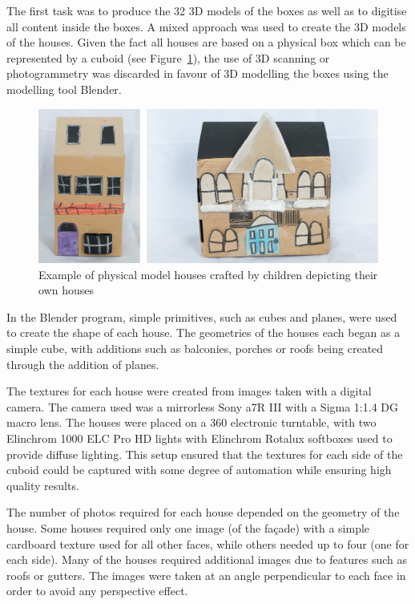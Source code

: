 \documentclass[acmlarge,screen,dvipsnames]{acmart}
\begin{document}
The first task was to produce the 32 3D models of the boxes as well as to
digitise all content inside the boxes. A mixed approach was used to create the
3D models of the houses. Given the fact all houses are based on a physical box
which can be represented by a cuboid (see Figure~\ref{fig:boxes}), the use of
3D scanning or photogrammetry was discarded in favour of 3D modelling the
boxes using the modelling tool Blender\cite{blender}. 


\begin{figure}[ht] \centering
\includegraphics[width=\linewidth]{images/boxes.png} \caption{Example
of physical model houses crafted by children depicting their own houses}
\label{fig:boxes} \end{figure}

In the Blender program, simple primitives, such as cubes and planes, were used
to create the shape of each house. The geometries of the houses each began as
a simple cube, with additions such as balconies, porches or roofs being
created through the addition of planes.


The textures for each house were created from images taken with a digital
camera. The camera used was a mirrorless Sony a7R III with a Sigma 1:1.4 DG
macro lens. The houses were placed on a 360 electronic turntable, with two
Elinchrom 1000 ELC Pro HD lights with Elinchrom Rotalux softboxes used to
provide diffuse lighting. This setup ensured that the textures for each side
of the cuboid could be captured with some degree of automation while ensuring
high quality results.
 
 The number of photos required for each house depended on the geometry of the
 house. Some houses required only one image (of the fa\c{c}ade) with a simple
 cardboard texture used for all other faces, while others needed up to four
 (one for each side). Many of the houses required additional images due to
 features such as roofs or gutters. The images were taken at an angle
 perpendicular to each face in order to avoid any perspective effect. 
\end{document}
